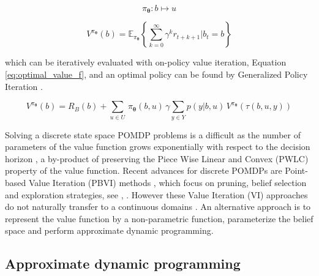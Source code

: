 \documentclass[final,5p,times,twocolumn]{elsarticle}
\newcommand{\Param}{\boldsymbol{\theta}}
\begin{document}
\begin{equation}\label{eq:policy}
  \pi_{\Param} : b \mapsto u
\end{equation}

\begin{equation}\label{eq:expected_reward_back}
 V^{\pi_{\Param}}(b) = \mathbb{E}_{\pi_{\Param}} \left\{  \sum^{\infty}_{k=0} \gamma^k r_{t+k+1} \Bigg\lvert b_t = b \right\}
\end{equation}

which can be iteratively evaluated with on-policy value iteration, Equation \ref{eq:optimal_value_f}, and an optimal policy can be found 
by Generalized Policy Iteration \cite[Chap. 4.6]{sutton1998reinforcement}.

\begin{equation} \label{eq:optimal_value_f}
  V^{\pi_{\Param}}(b) = R_B(b) + \sum\limits_{u \in U}\, \pi_{\Param}(b,u)\, \gamma \sum\limits_{y\in Y} p(y|b,u)\, V^{\pi_{\Param}}(\tau(b,u,y))
\end{equation}

Solving a discrete state space POMDP problems is a difficult as the number of parameters of the value function grows 
exponentially with respect to the decision horizon \cite[Chap. 15]{Thrun_Burgard_Fox_2005}\cite{Sondik_1973},
a by-product of preserving the Piece Wise Linear and Convex (PWLC) property of the value function. Recent 
advances for discrete POMDPs are  Point-based Value Iteration (PBVI) methods \cite{PBVI_2003}, which focus
on pruning, belief selection and exploration strategies, see \cite{Veiga14aaai}, \cite{POMDP_approach_2010}.
However these Value Iteration (VI) approaches do not naturally transfer to a 
continuous domains \cite{cPBVI_2006}. An alternative approach is to represent the value function by a non-parametric function,
parameterize the belief space and perform approximate dynamic programming.


\subsection{Approximate dynamic programming}

%

%
\end{document}
